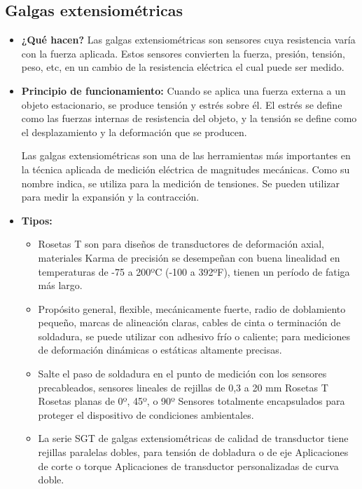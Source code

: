 \subsection*{Galgas extensiométricas}
\begin{itemize}
	\item \textbf{¿Qué hacen?} Las galgas extensiométricas son sensores cuya resistencia varía con la fuerza aplicada. Estos sensores convierten la fuerza, presión, tensión, peso, etc, en un cambio de la resistencia eléctrica el cual puede ser medido.
	\item \textbf{Principio de funcionamiento:} Cuando se aplica una fuerza externa a un objeto estacionario, se produce tensión y estrés sobre él. El estrés se define como las fuerzas internas de resistencia del objeto, y la tensión se define como el desplazamiento y la deformación que se producen.
	
	Las galgas extensiométricas son una de las herramientas más importantes en la técnica aplicada de medición eléctrica de magnitudes mecánicas. Como su nombre indica, se utiliza para la medición de tensiones. Se pueden utilizar para medir la expansión y la contracción.
	\item \textbf{Tipos:}
	\begin{itemize}
		\item {} Rosetas T son para diseños de transductores de deformación axial, materiales Karma de precisión se desempeñan con buena linealidad en temperaturas de -75 a 200ºC (-100 a 392ºF), tienen un período de fatiga más largo.
		\item {} Propósito general, flexible, mecánicamente fuerte, radio de doblamiento pequeño, marcas de alineación claras, cables de cinta o terminación de soldadura, se puede utilizar con adhesivo frío o caliente; para mediciones de deformación dinámicas o estáticas altamente precisas.
		\item {} Salte el paso de soldadura en el punto de medición con los sensores precableados, sensores lineales de rejillas de 0,3 a 20 mm
		Rosetas T
		Rosetas planas de 0º, 45º, o 90º
		Sensores totalmente encapsulados para proteger el dispositivo de condiciones ambientales.
		\item {} La serie SGT de galgas extensiométricas de calidad de transductor tiene rejillas paralelas dobles, para tensión de dobladura o de eje
		Aplicaciones de corte o torque
		Aplicaciones de transductor personalizadas de curva doble. \cite{Omega_GalgasExtensiometricas}
	\end{itemize}
\end{itemize}

